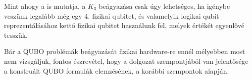Mint ahogy a  is mutatja, a $K_3$ beágyazása csak úgy lehetséges, ha igénybe veszünk legalább még egy 4. fizikai qubitet, és valamelyik logikai qubit reprezentálásához kettő fizikai qubitet használunk fel, melyek értékét egyenlővé tesszük.

Bár a QUBO problémák beágyazását fizikai hardware-re ennél mélyebben most nem vizsgáljuk, fontos észrevétel, hogy a dolgozat szempontjából van jelentősége a konstruált QUBO formulák elemzésének, a korábbi szempontok alapján.